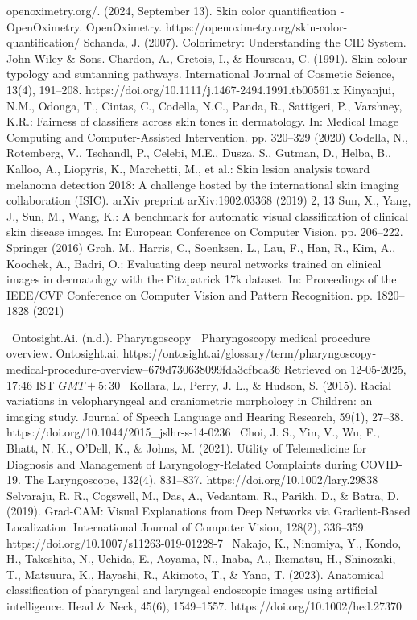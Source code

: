 \begin{thebibliography}{}

openoximetry.org/. (2024, September 13). Skin color quantification - OpenOximetry. OpenOximetry. https://openoximetry.org/skin-color-quantification/
Schanda, J. (2007). Colorimetry: Understanding the CIE System. John Wiley \& Sons.
Chardon, A., Cretois, I., \& Hourseau, C. (1991). Skin colour typology and suntanning pathways. International Journal of Cosmetic Science, 13(4), 191–208. https://doi.org/10.1111/j.1467-2494.1991.tb00561.x
Kinyanjui, N.M., Odonga, T., Cintas, C., Codella, N.C., Panda, R., Sattigeri, P., Varshney, K.R.: Fairness of classifiers across skin tones in dermatology. In: Medical Image Computing and Computer-Assisted Intervention. pp. 320–329 (2020)
Codella, N., Rotemberg, V., Tschandl, P., Celebi, M.E., Dusza, S., Gutman, D., Helba, B., Kalloo, A., Liopyris, K., Marchetti, M., et al.: Skin lesion analysis toward melanoma detection 2018: A challenge hosted by the international skin imaging collaboration (ISIC). arXiv preprint arXiv:1902.03368 (2019) 2, 13
Sun, X., Yang, J., Sun, M., Wang, K.: A benchmark for automatic visual classification of clinical skin disease images. In: European Conference on Computer Vision. pp. 206–222. Springer (2016)
Groh, M., Harris, C., Soenksen, L., Lau, F., Han, R., Kim, A., Koochek, A., Badri, O.: Evaluating deep neural networks trained on clinical images in dermatology with the Fitzpatrick 17k dataset. In: Proceedings of the IEEE/CVF Conference on Computer Vision and Pattern Recognition. pp. 1820–1828 (2021) 




~Ontosight.Ai. (n.d.). Pharyngoscopy | Pharyngoscopy medical procedure overview. Ontosight.ai. https://ontosight.ai/glossary/term/pharyngoscopy-medical-procedure-overview--679d730638099fda3cfbca36 Retrieved on 12-05-2025, 17:46 IST \(GMT +5:30\)
~Kollara, L., Perry, J. L., \& Hudson, S. (2015). Racial variations in velopharyngeal and craniometric morphology in Children: an imaging study. Journal of Speech Language and Hearing Research, 59(1), 27–38. https://doi.org/10.1044/2015\_jslhr-s-14-0236
~Choi, J. S., Yin, V., Wu, F., Bhatt, N. K., O’Dell, K., \& Johns, M. (2021). Utility of Telemedicine for Diagnosis and Management of Laryngology‐Related Complaints during COVID‐19. The Laryngoscope, 132(4), 831–837. https://doi.org/10.1002/lary.29838
Selvaraju, R. R., Cogswell, M., Das, A., Vedantam, R., Parikh, D., \& Batra, D. (2019). Grad-CAM: Visual Explanations from Deep Networks via Gradient-Based Localization. International Journal of Computer Vision, 128(2), 336–359. https://doi.org/10.1007/s11263-019-01228-7
~Nakajo, K., Ninomiya, Y., Kondo, H., Takeshita, N., Uchida, E., Aoyama, N., Inaba, A., Ikematsu, H., Shinozaki, T., Matsuura, K., Hayashi, R., Akimoto, T., \& Yano, T. (2023). Anatomical classification of pharyngeal and laryngeal endoscopic images using artificial intelligence. Head \& Neck, 45(6), 1549–1557. https://doi.org/10.1002/hed.27370


\end{thebibliography}
